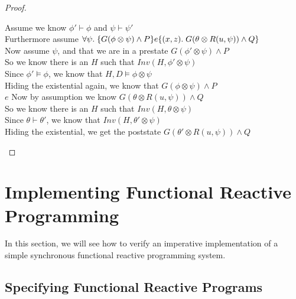 \begin{proof}
\begin{tabbedproof}
\oo Assume we know $\phi' \vdash \phi$ and $\psi \vdash \psi'$ \\
\oo Furthermore assume $\forall \psi.\; \{{G(\phi \otimes \psi) \land P}\}{e}\{{(x,z)}.\;{G(\theta\otimes R(u, \psi)) \land Q}\}$ \\
\ooo Now assume $\psi$, and that we are in a prestate $G(\phi' \otimes \psi) \land P$ \\
\ooo So we know there is an $H$ such that $\mathit{Inv}(H, \phi' \otimes \psi)$ \\
\ooo Since $\phi' \models \phi$, we know that $H, D \models \phi \otimes \psi$ \\
\ooo Hiding the existential again, we know that $G(\phi \otimes \psi) \land P$ \\
\ooo $e$
\ooo Now by assumption we know $G(\theta \otimes R(u, \psi)) \land Q$ \\
\ooo So we know there is an $H$ such that $\mathit{Inv}(H, \theta \otimes \psi)$ \\
\ooo Since $\theta \vdash \theta'$, we know that $\mathit{Inv}(H, \theta' \otimes \psi)$ \\
\ooo Hiding the existential, we get the poststate $G(\theta'\otimes R(u, \psi)) \land Q$ \\
\end{tabbedproof}
\end{proof}

\section{Implementing Functional Reactive Programming}

In this section, we will see how to verify an imperative
implementation of a simple synchronous functional reactive programming
system.

\subsection{Specifying Functional Reactive Programs}

